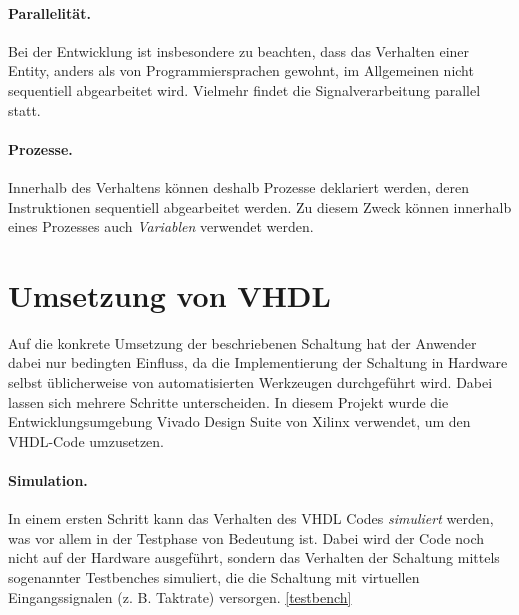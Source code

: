 \paragraph{Parallelität.} Bei der Entwicklung ist insbesondere zu beachten, dass das Verhalten einer Entity, anders als von Programmiersprachen gewohnt, im Allgemeinen nicht sequentiell abgearbeitet wird. Vielmehr findet die Signalverarbeitung parallel statt.

\paragraph{Prozesse.} Innerhalb des Verhaltens können deshalb Prozesse deklariert werden, deren Instruktionen sequentiell abgearbeitet werden. Zu diesem Zweck können innerhalb eines Prozesses auch \textit{Variablen} verwendet werden. \cite[S. 29f.]{kesel2013entwurf}
 
\section{Umsetzung von VHDL}
Auf die konkrete Umsetzung der beschriebenen Schaltung hat der Anwender dabei nur bedingten Einfluss, da die Implementierung der Schaltung in Hardware selbst üblicherweise von automatisierten Werkzeugen durchgeführt wird. Dabei lassen sich mehrere Schritte unterscheiden. In diesem Projekt wurde die Entwicklungsumgebung Vivado Design Suite von Xilinx verwendet, um den VHDL-Code umzusetzen.

\paragraph{Simulation.} In einem ersten Schritt kann das Verhalten des VHDL Codes \emph{simuliert} werden, was vor allem in der Testphase von Bedeutung ist. Dabei wird der Code noch nicht auf der Hardware ausgeführt, sondern das Verhalten der Schaltung mittels sogenannter Testbenches simuliert, die die Schaltung mit virtuellen Eingangssignalen (z. B. Taktrate) versorgen. \cite[S. 81]{SynthesisFPGA} \ref{testbench}

